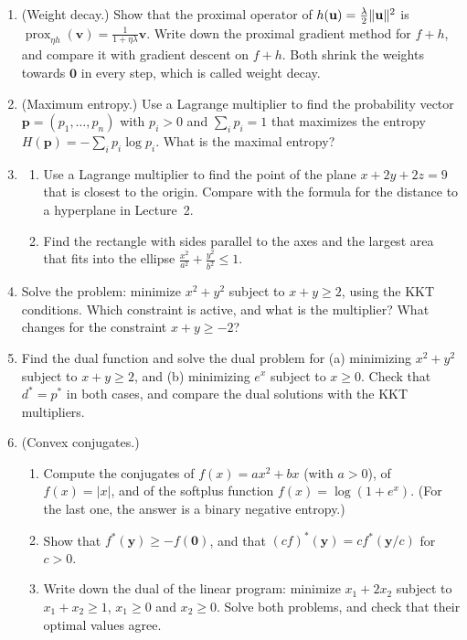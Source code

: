 \begin{enumerate}[leftmargin=*]
    \item (Weight decay.) Show that the proximal operator of $h(\mathbf{u}) = \frac{\lambda}{2}\lVert \mathbf{u} \rVert^2$ is $\operatorname{prox}_{\eta h}(\mathbf{v}) = \frac{1}{1 + \eta\lambda}\mathbf{v}$. Write down the proximal gradient method for $f + h$, and compare it with gradient descent on $f + h$. Both shrink the weights towards $\mathbf{0}$ in every step, which is called weight decay.
    \item \homework{} (Maximum entropy.) Use a Lagrange multiplier to find the probability vector $\mathbf{p} = (p_1, \ldots, p_n)$ with $p_i > 0$ and $\sum_i p_i = 1$ that maximizes the entropy $H(\mathbf{p}) = -\sum_i p_i\log p_i$. What is the maximal entropy?
    \item \begin{enumerate}[label=(\alph*)]
        \item Use a Lagrange multiplier to find the point of the plane $x + 2y + 2z = 9$ that is closest to the origin. Compare with the formula for the distance to a hyperplane in Lecture~2.
        \item Find the rectangle with sides parallel to the axes and the largest area that fits into the ellipse $\frac{x^2}{a^2} + \frac{y^2}{b^2} \leq 1$.
    \end{enumerate}
    \item \homework{} Solve the problem: minimize $x^2 + y^2$ subject to $x + y \geq 2$, using the KKT conditions. Which constraint is active, and what is the multiplier? What changes for the constraint $x + y \geq -2$?
    \item Find the dual function and solve the dual problem for (a) minimizing $x^2 + y^2$ subject to $x + y \geq 2$, and (b) minimizing $e^x$ subject to $x \geq 0$. Check that $d^* = p^*$ in both cases, and compare the dual solutions with the KKT multipliers.
    \item (Convex conjugates.)
    \begin{enumerate}[label=(\alph*)]
        \item Compute the conjugates of $f(x) = ax^2 + bx$ (with $a > 0$), of $f(x) = |x|$, and of the softplus function $f(x) = \log(1 + e^x)$. (For the last one, the answer is a binary negative entropy.)
        \item Show that $f^*(\mathbf{y}) \geq -f(\mathbf{0})$, and that $(cf)^*(\mathbf{y}) = cf^*(\mathbf{y}/c)$ for $c > 0$.
        \item Write down the dual of the linear program: minimize $x_1 + 2x_2$ subject to $x_1 + x_2 \geq 1$, $x_1 \geq 0$ and $x_2 \geq 0$. Solve both problems, and check that their optimal values agree.

\end{enumerate}
\end{enumerate}
